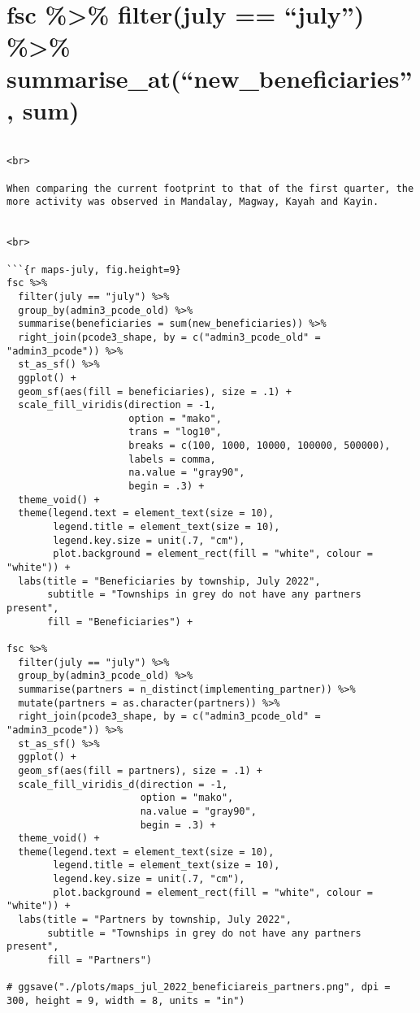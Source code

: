 \documentclass[
]{article}
\begin{document}
\hypertarget{fsc-filterjuly-july-summarise_atnew_beneficiaries-sum}{%
\section{fsc \%\textgreater\% filter(july == ``july'') \%\textgreater\%
summarise\_at(``new\_beneficiaries'',
sum)}\label{fsc-filterjuly-july-summarise_atnew_beneficiaries-sum}}

\begin{verbatim}

<br>

When comparing the current footprint to that of the first quarter, the more activity was observed in Mandalay, Magway, Kayah and Kayin. 


<br>

```{r maps-july, fig.height=9}
fsc %>% 
  filter(july == "july") %>% 
  group_by(admin3_pcode_old) %>% 
  summarise(beneficiaries = sum(new_beneficiaries)) %>% 
  right_join(pcode3_shape, by = c("admin3_pcode_old" = "admin3_pcode")) %>% 
  st_as_sf() %>% 
  ggplot() + 
  geom_sf(aes(fill = beneficiaries), size = .1) +
  scale_fill_viridis(direction = -1,
                     option = "mako", 
                     trans = "log10",
                     breaks = c(100, 1000, 10000, 100000, 500000), 
                     labels = comma, 
                     na.value = "gray90", 
                     begin = .3) + 
  theme_void() + 
  theme(legend.text = element_text(size = 10), 
        legend.title = element_text(size = 10), 
        legend.key.size = unit(.7, "cm"), 
        plot.background = element_rect(fill = "white", colour = "white")) + 
  labs(title = "Beneficiaries by township, July 2022", 
       subtitle = "Townships in grey do not have any partners present", 
       fill = "Beneficiaries") + 
  
fsc %>% 
  filter(july == "july") %>% 
  group_by(admin3_pcode_old) %>% 
  summarise(partners = n_distinct(implementing_partner)) %>% 
  mutate(partners = as.character(partners)) %>% 
  right_join(pcode3_shape, by = c("admin3_pcode_old" = "admin3_pcode")) %>% 
  st_as_sf() %>% 
  ggplot() + 
  geom_sf(aes(fill = partners), size = .1) +
  scale_fill_viridis_d(direction = -1,
                       option = "mako",
                       na.value = "gray90", 
                       begin = .3) + 
  theme_void() + 
  theme(legend.text = element_text(size = 10), 
        legend.title = element_text(size = 10), 
        legend.key.size = unit(.7, "cm"), 
        plot.background = element_rect(fill = "white", colour = "white")) + 
  labs(title = "Partners by township, July 2022", 
       subtitle = "Townships in grey do not have any partners present", 
       fill = "Partners")  

# ggsave("./plots/maps_jul_2022_beneficiareis_partners.png", dpi = 300, height = 9, width = 8, units = "in")
  
\end{verbatim}
\end{document}
